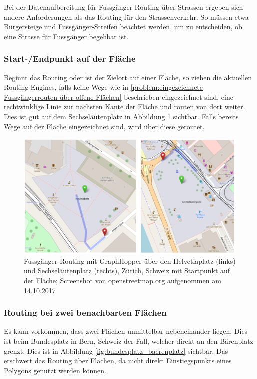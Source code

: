 Bei der Datenaufbereitung für Fussgänger-Routing über Strassen ergeben sich andere Anforderungen als das Routing für den Strassenverkehr. So müssen etwa Bürgersteige und Fussgänger-Streifen beachtet werden, um zu entscheiden, ob eine Strasse für Fussgänger begehbar ist.

\subsubsection{Start-/Endpunkt auf der Fläche}
\label{problem:Start-/Endpunkt auf der Fläche}
Beginnt das Routing oder ist der Zielort auf einer Fläche, so ziehen die aktuellen Routing-Engines, falls keine Wege wie in \ref{problem:eingezeichnete Fussgängerrouten über offene Flächen} beschrieben eingezeichnet sind, eine rechtwinklige Linie zur nächsten Kante der Fläche und routen von dort weiter. Dies ist gut auf dem Sechseläutenplatz in Abbildung \ref{fig:start_endpoint_on_area} sichtbar. Falls bereits Wege auf der Fläche eingezeichnet sind, wird über diese geroutet.

\begin{figure}[ht]
    \centering
    \includegraphics[width=1\linewidth]{technicalreport/img/start_endpoint_on_area}
    \caption[Fussgänger-Routing mit Startpunkt auf der Fläche]{Fussgänger-Routing mit GraphHopper über den Helvetiaplatz (links) und Sechseläutenplatz (rechts), Zürich, Schweiz mit Startpunkt auf der Fläche; Screenshot von openstreetmap.org aufgenommen am 14.10.2017}
    \label{fig:start_endpoint_on_area}
\end{figure}

\subsubsection{Routing bei zwei benachbarten Flächen}
\label{problem:Routing bei zwei benachbarten Flächen}
Es kann vorkommen, dass zwei Flächen unmittelbar nebeneinander liegen. Dies ist beim Bundesplatz in Bern, Schweiz der Fall, welcher direkt an den Bärenplatz grenzt. Dies ist in Abbildung \ref{fig:bundesplatz_baerenplatz} sichtbar. Das erschwert das Routing über Flächen, da nicht direkt \glspl{Einstiegspunkt} eines Polygons genutzt werden können.

